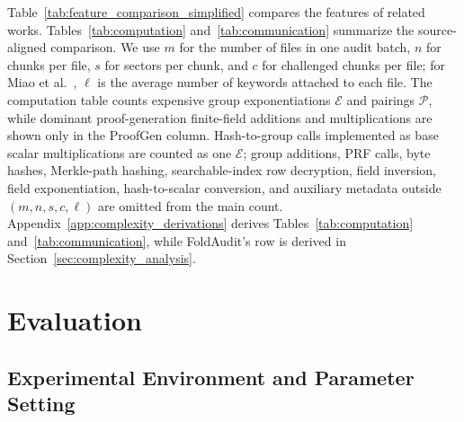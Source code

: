 \documentclass[lettersize,journal]{IEEEtran}
\newcommand{\CompExp}{\mathcal{E}}
\newcommand{\CompPair}{\mathcal{P}}
\begin{document}
Table~\ref{tab:feature_comparison_simplified} compares the features of related works.
Tables~\ref{tab:computation} and~\ref{tab:communication} summarize the source-aligned comparison. We use \(m\) for the number of files in one audit batch, \(n\) for chunks per file, \(s\) for sectors per chunk, and \(c\) for challenged chunks per file; for Miao et al.~\cite{MiaoSCIS2026}, \(\ell\) is the average number of keywords attached to each file. The computation table counts expensive group exponentiations \(\CompExp\) and pairings \(\CompPair\), while dominant proof-generation finite-field additions and multiplications are shown only in the \textsf{ProofGen} column. Hash-to-group calls implemented as base scalar multiplications are counted as one \(\CompExp\); group additions, PRF calls, byte hashes, Merkle-path hashing, searchable-index row decryption, field inversion, field exponentiation, hash-to-scalar conversion, and auxiliary metadata outside \((m,n,s,c,\ell)\) are omitted from the main count.
Appendix~\ref{app:complexity_derivations} derives Tables~\ref{tab:computation} and~\ref{tab:communication}, while FoldAudit's row is derived in Section~\ref{sec:complexity_analysis}.








\section{Evaluation}
\label{sec:evaluation}

\subsection{Experimental Environment and Parameter Setting}
\end{document}
